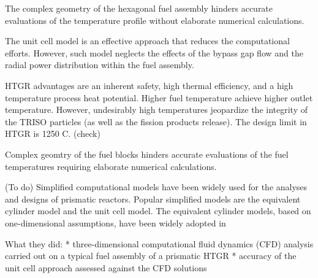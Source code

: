 
The complex geometry of the hexagonal fuel assembly hinders accurate evaluations of the temperature profile  without elaborate numerical calculations.

The unit cell model is an effective approach that reduces the computational efforts.
However, such model neglects the effects of the bypass gap flow and the radial power distribution within the fuel assembly.

HTGR advantages are an inherent safety, high thermal efficiency, and a high temperature process heat potential.
Higher fuel temperature achieve higher outlet temperature.
However, undesirably high temperatures jeopardize the integrity of the TRISO particles (as well as the fission products release).
The design limit in HTGR is 1250 C. (check)

Complex geomtry of the fuel blocks hinders accurate evaluations of the fuel temperatures requiring elaborate numerical calculations.



(To do)
Simplified computational models have been widely used for the analyses and designs of prismatic reactors. 
Popular simplified models are the equivalent cylinder model and the unit cell model.
The equivalent cylinder models, based on one-dimensional assumptions, have been widely adopted in



\cite{tak_numerical_2008}

What they did: \cite{tak_numerical_2008}
* three-dimensional computational fluid dynamics (CFD) analysis carried out on a typical fuel assembly of a prismatic HTGR
* accuracy of the unit cell approach assessed against the CFD solutions
